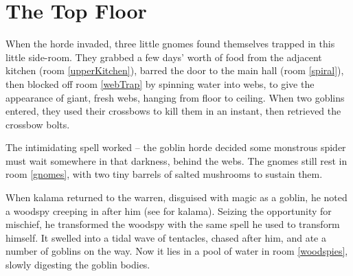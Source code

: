 \chapter{The Top Floor}
\epigraph{
  \iftoggle{hardcore}{
    I have township, yet no houses.
    Forests, but no trees.
    Rivers, but no water.
  }{
    Never resting, never still.

    Moving silently from hill to hill.

    It does not walk, run or trot.

    All is cool where it is not.
  }
}{}

\glsresetall

\noindent
\begin{exampletext}
  When the horde invaded, three little gnomes found themselves trapped in this little side-room.
  They grabbed a few days' worth of food from the adjacent kitchen (room \ref{upperKitchen}),
  barred the door to the main hall (room \ref{spiral}), then blocked off room \ref{webTrap} by spinning water into webs, to give the appearance of giant, fresh webs, hanging from floor to ceiling.
  When two goblins entered, they used their crossbows to kill them in an instant, then retrieved the crossbow bolts.

  The intimidating spell worked -- the goblin horde decided some monstrous spider must wait somewhere in that darkness, behind the webs.
  The gnomes still rest in room \vref{gnomes}, with two tiny barrels of salted mushrooms to sustain them.

  When \gls{kalama}%
  returned to the \gls{warren}, disguised with magic as a goblin, he noted a woodspy%
  creeping in after him
  (see  for \gls{kalama}).
  Seizing the opportunity for mischief, he transformed the woodspy with the same spell he used to transform himself.
  It swelled into a tidal wave of tentacles, chased after him, and ate a number of goblins on the way.
  Now it lies in a pool of water in room \ref{woodspies}, slowly digesting the goblin bodies.
\end{exampletext}

